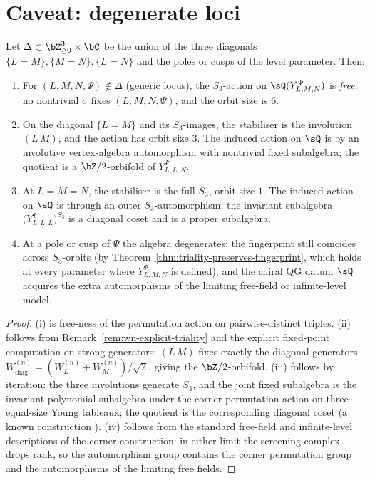 \section{Caveat: degenerate loci}
\label{sec:triality-caveat}

\begin{theorem}
\label{thm:triality-obstruction-non-generic}
Let $\Delta \subset \bZ_{\ge 0}^3 \times \bC$ be the union of the
three diagonals $\{L = M\}, \{M = N\}, \{L = N\}$ and the poles or
cusps of the level parameter. Then:
\begin{enumerate}
\item[(i)] For $(L,M,N,\Psi) \notin \Delta$ (generic locus), the
 $S_3$-action on $\sQ(Y_{L,M,N}^\Psi)$ is \emph{free}: no
 nontrivial $\sigma$ fixes $(L,M,N,\Psi)$, and the orbit size is $6$.
\item[(ii)] On the diagonal $\{L=M\}$ and its $S_3$-images, the
 stabiliser is the involution $(L\,M)$, and the action has orbit
 size $3$. The induced action on $\sQ$ is by an
 involutive vertex-algebra automorphism with nontrivial fixed
 subalgebra; the quotient is a $\bZ/2$-orbifold of
 $Y_{L,L,N}^\Psi$.
\item[(iii)] At $L = M = N$, the stabiliser is the full $S_3$,
 orbit size $1$. The induced action on $\sQ$ is through an
 outer $S_3$-automorphism; the invariant subalgebra
 $\bigl(Y_{L,L,L}^\Psi\bigr)^{S_3}$ is a diagonal coset and is a
 proper subalgebra.
\item[(iv)] At a pole or cusp of $\Psi$ the algebra degenerates; the
 fingerprint still coincides across $S_3$-orbits (by
 Theorem~\ref{thm:triality-preserves-fingerprint}, which holds at
 every parameter where $Y_{L,M,N}^\Psi$ is defined), and the
 chiral QG datum $\sQ$ acquires the extra automorphisms of the
 limiting free-field or infinite-level model.
\end{enumerate}
\end{theorem}

\begin{proof}
(i) is free-ness of the permutation action on pairwise-distinct
triples. (ii) follows from Remark~\ref{rem:wn-explicit-triality}
and the explicit fixed-point computation on
strong generators: $(L\,M)$ fixes exactly the diagonal generators
$W^{(n)}_{\mathrm{diag}} = (W^{(n)}_L + W^{(n)}_M)/\sqrt{2}$, giving the
$\bZ/2$-orbifold. (iii) follows by iteration: the three
involutions generate $S_3$, and the joint fixed subalgebra is the
invariant-polynomial subalgebra under the corner-permutation action
on three equal-size Young tableaux; the quotient is the corresponding
diagonal coset (a known construction
\cite{ProchazkRapcak2018}).
(iv) follows from the standard free-field and infinite-level
descriptions of the corner construction: in either limit the screening
complex drops rank, so the automorphism group contains the corner
permutation group and the automorphisms of the limiting free fields.
\end{proof}

